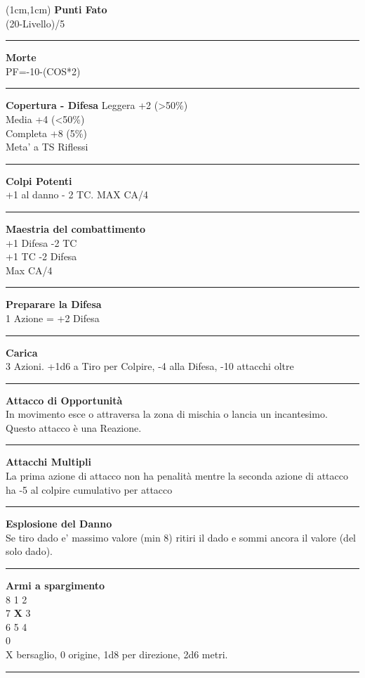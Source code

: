 \documentclass[a4paper,12 pt,openany]{book}
\newcommand{\riga}{\rule{\textwidth}{0.4pt}}
\begin{document}
\begin{textblock*}{4cm}(1cm,1cm) %
{\textbf{Punti Fato}\\
(20-Livello)/5}

\riga

{\textbf{Morte}\\
PF=-10-(COS*2)}

\riga

\textbf{Copertura - Difesa}
Leggera +2 (>50\%)\\
Media +4 (<50\%)\\
Completa +8 (5\%)\\
Meta' a TS Riflessi

\riga

\textbf{Colpi Potenti}\\
+1 al danno - 2 TC. MAX CA/4

\riga

\textbf{Maestria del combattimento}\\
+1 Difesa -2 TC\\
+1 TC -2 Difesa\\
Max CA/4

\riga

\textbf{Preparare la Difesa}\\
1 Azione = +2 Difesa

\riga

\textbf{Carica}\\
3 Azioni. +1d6 a Tiro per Colpire, -4 alla Difesa, -10 attacchi oltre

\riga

\textbf{Attacco di Opportunità}\\
In movimento esce o attraversa la zona di mischia o lancia un incantesimo. Questo attacco è una Reazione.

\riga

\textbf{Attacchi Multipli}\\
La prima azione di attacco non ha penalità mentre la seconda azione di attacco ha -5 al colpire cumulativo per attacco

\riga

\textbf{Esplosione del Danno}\\
Se tiro dado e' massimo valore (min 8) ritiri il dado e sommi ancora il valore (del solo dado).

\riga

\textbf{Armi a spargimento}\\
8 1 2\\
7 \textbf{X} 3\\
6 5 4\\
0\\
X bersaglio, 0 origine, 1d8 per direzione, 2d6 metri.

\riga



\end{textblock*}
\end{document}
